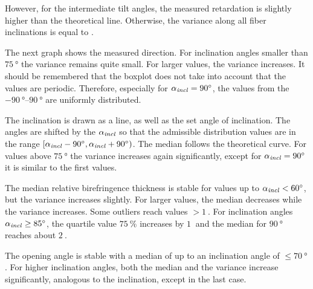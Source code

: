 However, for the intermediate tilt angles, the measured retardation is slightly higher than the theoretical line.
Otherwise, the variance along all fiber inclinations is equal to \modelInc{}.
\par
%
The next graph shows the measured direction.
For inclination angles smaller than $\SI{75}{\degree}$ the variance remains quite small.
For larger values, the variance increases.
It should be remembered that the boxplot does not take into account that the values are periodic.
Therefore, especially for $\textnormal{$\alpha_{\mathit{incl}}$}=\SI{90}{\degree}$, the values from the $\SIrange{-90}{90}{\degree}$ are uniformly distributed.
\par
%
The inclination is drawn as a line, as well as the set angle of inclination.
The angles are shifted by the $\textnormal{$\alpha_{\mathit{incl}}$}$ so that the admissible distribution values are in the range $[\textnormal{$\alpha_{\mathit{incl}}$}-\SI{90}{\degree}, \textnormal{$\alpha_{\mathit{incl}}$}+\SI{90}{\degree})$.
The median follows the theoretical curve.
For values above $\SI{75}{\degree}$ the variance increases again significantly, except for $\textnormal{$\alpha_{\mathit{incl}}$} = \SI{90}{\degree}$ it is similar to the first values.
\par
%
The median relative birefringence thickness \trel{} is stable for values up to $\textnormal{$\alpha_{\mathit{incl}}$} < \SI{60}{\degree}$, but the variance increases slightly.
For larger values, the median decreases while the variance increases.
Some outliers reach values $>\SI{1}{}$.
For inclination angles $\textnormal{$\alpha_{\mathit{incl}}$} \ge \SI{85}{\degree}$, the quartile value $\SI{75}{\percent}$ increases by $\SI{1}{}$ and the median for $\SI{90}{\degree}$ reaches about $\SI{2}{}$.
\par
%
The opening angle \openingAngle{} is stable with a median of \dummy{} up to an inclination angle of $\le \SI{70}{\degree}$.
For higher inclination angles, both the median and the variance increase significantly, analogous to the inclination, except in the last case.
%
%
%
